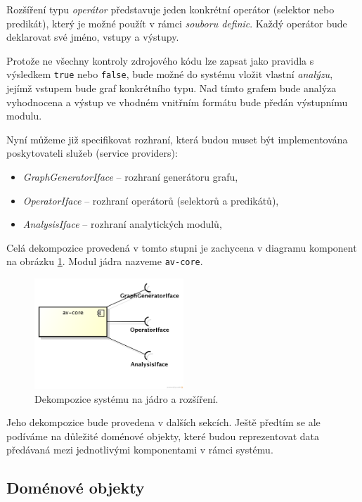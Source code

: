 Rozšíření typu \emph{operátor} představuje jeden konkrétní operátor (selektor nebo predikát), který je možné použít v rámci \emph{souboru definic}. Každý operátor bude deklarovat své jméno, vstupy a výstupy.

Protože ne všechny kontroly zdrojového kódu lze zapsat jako pravidla s výsledkem \verb+true+ nebo \verb+false+, bude možné do systému vložit vlastní \emph{analýzu}, jejímž vstupem bude graf konkrétního typu. Nad tímto grafem bude analýza vyhodnocena a výstup ve vhodném vnitřním formátu bude předán výstupnímu modulu.

Nyní můžeme již specifikovat rozhraní, která budou muset být implementována poskytovateli služeb (service providers):

\begin{itemize}
\item \emph{GraphGeneratorIface} -- rozhraní generátoru grafu,
\item \emph{OperatorIface} -- rozhraní operátorů (selektorů a predikátů),
\item \emph{AnalysisIface} -- rozhraní analytických modulů,
\end{itemize}

Celá dekompozice provedená v tomto stupni je zachycena v diagramu komponent na obrázku \ref{design-modules}. Modul jádra nazveme \verb+av-core+.
\begin{figure}[h!]
  \centering
  \includegraphics[width=0.5\textwidth]{./uml/archval_module_cmp.png}
  \caption{Dekompozice systému na jádro a rozšíření.\label{design-modules}}
\end{figure}
Jeho dekompozice bude provedena v dalších sekcích. Ještě předtím se ale podíváme na důležité doménové objekty, které budou reprezentovat data předávaná mezi jednotlivými komponentami v rámci systému.

\subsection{Doménové objekty}
\label{design-domain_objects}

